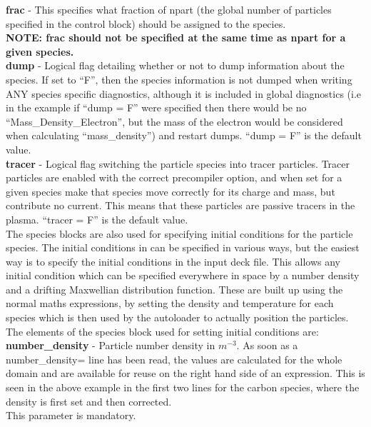 \documentclass[12pt,a4paper]{article}
\newcommand{\emphtext}{\color{warwickdark} \fontfamily{phv}\selectfont\large\bf}
\newcommand{\EPOCH}{{\color{warwickdark}\fontfamily{phv}\selectfont{EPOCH}}}
\begin{document}
{\emphtext frac} - This specifies what fraction of npart (the
global number of particles specified in the control block) should be assigned
to the species.\\

{\emphtext NOTE: frac should not be specified at the same time as npart for a
given species.}\\

{\emphtext dump} - Logical flag detailing whether or not to dump
information about the species. If set to ``F'', then the species information
is not dumped when writing ANY species specific diagnostics, although it is
included in global diagnostics (i.e in the example if ``dump = F'' were
specified then there would be no ``Mass\_Density\_Electron'', but the mass of
the electron would be considered when calculating ``mass\_density'') and
restart dumps. ``dump = F'' is the default value.\\

{\emphtext tracer} - Logical flag switching the particle species
into tracer particles. Tracer particles are enabled with the correct
precompiler option, and when set for a given species make that species move
correctly for its charge and mass, but contribute no current. This means that
these particles are passive tracers in the plasma. ``tracer = F'' is the
default value.\\

The species blocks are also used for specifying initial conditions for
the particle species. The initial conditions in {\EPOCH} can be specified in
various ways, but the easiest way is to specify the initial conditions in the
input deck file. This allows any initial condition which can be specified
everywhere in space by a number density and a drifting Maxwellian distribution
function.
These are built up using the normal maths
expressions, by setting the density and temperature for each species which is
then used by the autoloader to actually position the particles. \\
The elements of the species block used for setting
initial conditions are:\\

{\emphtext number\_density} - Particle number density in $m^{-3}$.
As soon as a number\_density= line has been read, the values are
calculated for the whole domain and are available for reuse on the right hand
side of an expression. This is seen in the above example in the first two lines
for the carbon species, where the density is first set and then corrected.\\
This parameter is mandatory.\\
\end{document}
